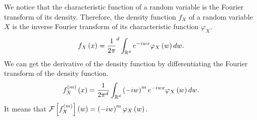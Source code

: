 

We notice that the characteristic function of a random variable is the Fourier
transform of its density. Therefore, the density function $f_X$ of a random
variable $X$ is the inverse Fourier transform of its characteristic function
$\varphi_X$.
\begin{equation*}
	f_X\left(x\right) = \frac{1}{2\pi}^d \int_{\mathbb{R}^d} e^{-iwx} \varphi_X\left(w\right)dw.
\end{equation*}
We can get the derivative of the density function by differentiating the Fourier transform of the density function.
\begin{equation*}
	f_X^{(m)}\left(x\right)= \frac{1}{2\pi^d} \int_{\mathbb{R}^d} \left(-iw\right)^m e^{-iwx} \varphi_X\left(w\right)dw.
\end{equation*}
It means that $\mathcal{F}\left[f_X^{(m)}\right]\left(w\right) = \left(-iw\right)^m \varphi_X\left(w\right).$

